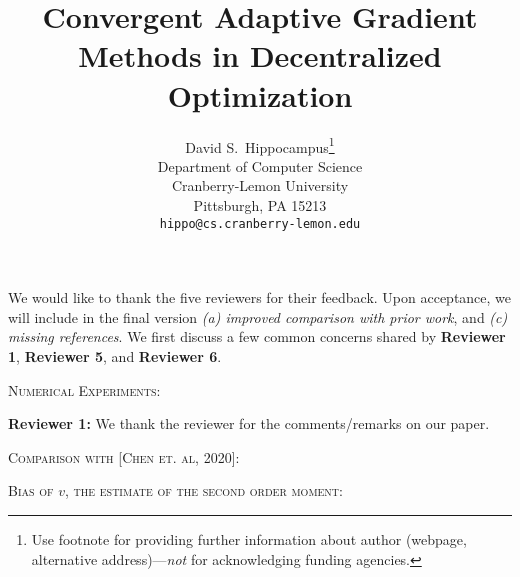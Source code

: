 \documentclass{article} %
\title{Convergent Adaptive Gradient Methods in Decentralized Optimization\vspace{-0.15in}}
\begin{document}
\maketitle


\author{%
  David S.~Hippocampus\thanks{Use footnote for providing further information
    about author (webpage, alternative address)---\emph{not} for acknowledging
    funding agencies.} \\
  Department of Computer Science\\
  Cranberry-Lemon University\\
  Pittsburgh, PA 15213 \\
  \texttt{hippo@cs.cranberry-lemon.edu} \\
}



We would like to thank the five reviewers for their feedback. Upon acceptance, we will include in the final version \emph{{\sf (a)} improved comparison with prior work}, and \emph{{\sf (c)} missing references}. 
We first discuss a few common concerns shared by \textbf{Reviewer 1},  \textbf{Reviewer 5}, and  \textbf{Reviewer 6}.

 \textsc{Numerical Experiments:} 


\textbf{Reviewer 1:}
We thank the reviewer for the comments/remarks on our paper. \vspace{-4pt}

\textsc{Comparison with [Chen et. al, 2020]:}

 \vspace{-2pt}
\textsc{Bias of $v$, the estimate of the second order moment:}
\end{document}

